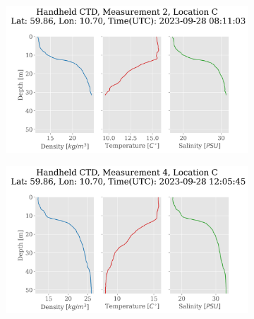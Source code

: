 \documentclass[a4paper,10pt,english]{article}
\begin{document}
    \begin{figure}[H]
            \begin{adjustwidth}{-2.5cm}{-2.5cm}  %
            \begin{subfigure}{0.65\textwidth}
                \centering
                \includegraphics[width=1.\linewidth]{../figures/handheld_ctd/handhedld_ctd_Measurement_2_Location_C.png}
                \caption{}
                \label{fig:handheld_m2lC}
            \end{subfigure}%
            \begin{subfigure}{0.65\textwidth}
                \centering
                \includegraphics[width=1.\linewidth]{../figures/handheld_ctd/handhedld_ctd_Measurement_4_Location_C.png}
                \caption{}
                \label{fig:handheld_m4lC}
            \end{subfigure}
        

\end{adjustwidth}
\end{figure}
\end{document}

